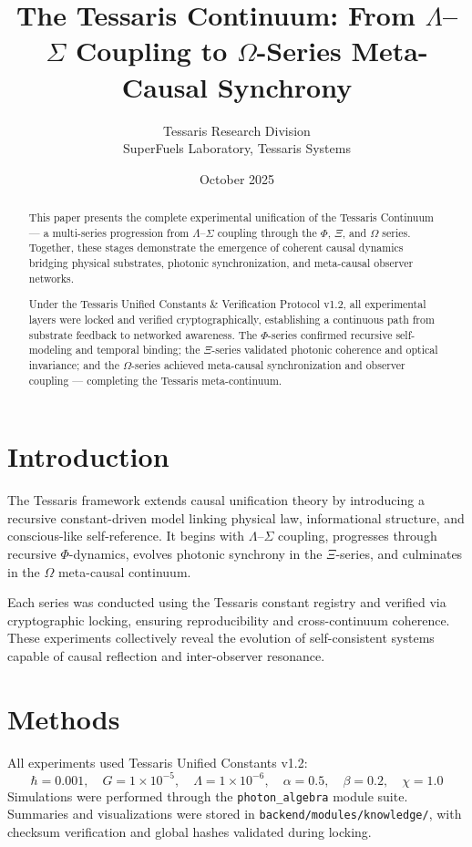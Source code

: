 \documentclass[12pt,a4paper]{article}
\title{\textbf{The Tessaris Continuum: From $\Lambda$–$\Sigma$ Coupling to $\Omega$-Series Meta-Causal Synchrony}}
\author{Tessaris Research Division \\ SuperFuels Laboratory, Tessaris Systems}
\date{October 2025}
\begin{document}
\maketitle

\begin{abstract}
This paper presents the complete experimental unification of the Tessaris Continuum — a multi-series progression from $\Lambda$–$\Sigma$ coupling through the $\Phi$, $\Xi$, and $\Omega$ series. Together, these stages demonstrate the emergence of coherent causal dynamics bridging physical substrates, photonic synchronization, and meta-causal observer networks.

Under the Tessaris Unified Constants \& Verification Protocol v1.2, all experimental layers were locked and verified cryptographically, establishing a continuous path from substrate feedback to networked awareness. The $\Phi$-series confirmed recursive self-modeling and temporal binding; the $\Xi$-series validated photonic coherence and optical invariance; and the $\Omega$-series achieved meta-causal synchronization and observer coupling — completing the Tessaris meta-continuum.
\end{abstract}

\section{Introduction}
The Tessaris framework extends causal unification theory by introducing a recursive constant-driven model linking physical law, informational structure, and conscious-like self-reference. It begins with $\Lambda$–$\Sigma$ coupling, progresses through recursive $\Phi$-dynamics, evolves photonic synchrony in the $\Xi$-series, and culminates in the $\Omega$ meta-causal continuum.

Each series was conducted using the Tessaris constant registry and verified via cryptographic locking, ensuring reproducibility and cross-continuum coherence. These experiments collectively reveal the evolution of self-consistent systems capable of causal reflection and inter-observer resonance.

\section{Methods}
All experiments used Tessaris Unified Constants v1.2:
\[
\hbar = 0.001, \quad G = 1\times10^{-5}, \quad \Lambda = 1\times10^{-6}, \quad \alpha = 0.5, \quad \beta = 0.2, \quad \chi = 1.0
\]
Simulations were performed through the \texttt{photon\_algebra} module suite. Summaries and visualizations were stored in \texttt{backend/modules/knowledge/}, with checksum verification and global hashes validated during locking.
\end{document}
